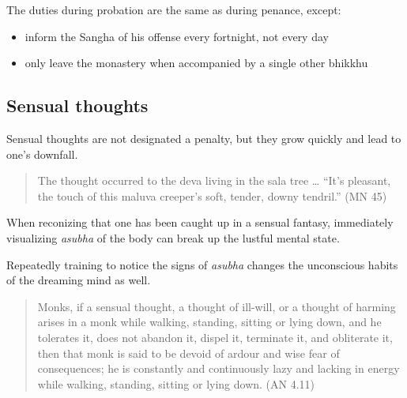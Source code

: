 The duties during probation are the same as during penance, except:

\begin{itemize}
\tightlist
\item
  inform the Sangha of his offense every fortnight, not every day
\item
  only leave the monastery when accompanied by a single other bhikkhu
\end{itemize}

\subsection{Sensual thoughts}

Sensual thoughts are not designated a penalty, but they grow quickly and
lead to one's downfall.

\begin{quote}
The thought occurred to the deva living in the sala tree \ldots{} ``It's
pleasant, the touch of this maluva creeper's soft, tender, downy
tendril.'' (MN 45)
\end{quote}

When reconizing that one has been caught up in a sensual fantasy,
immediately visualizing \emph{asubha} of the body can break up the
lustful mental state.

Repeatedly training to notice the signs of \emph{asubha} changes the
unconscious habits of the dreaming mind as well.

\begin{quote}
Monks, if a sensual thought, a thought of ill-will, or a thought of
harming arises in a monk while walking, standing, sitting or lying down,
and he tolerates it, does not abandon it, dispel it, terminate it, and
obliterate it, then that monk is said to be devoid of ardour and wise
fear of consequences; he is constantly and continuously lazy and lacking
in energy while walking, standing, sitting or lying down. (AN 4.11)
\end{quote}

